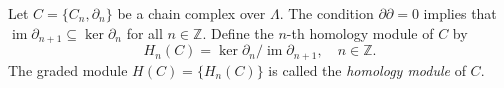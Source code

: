 Let $C = \{C_n, \partial_n\}$ be a chain complex over $\Lambda$. The condition $\partial \partial = 0$ implies that $\operatorname{im} \partial_{n+1} \subseteq \ker \partial_n$ for all $n \in \mathbb{Z}$. Define the $n$-th homology module of $C$ by
$$
H_n(C) = \ker \partial_n / \operatorname{im} \partial_{n+1}, \quad n \in \mathbb{Z}.
$$
The graded module $H(C) = \{H_n(C)\}$ is called the \textit{homology module} of $C$.
